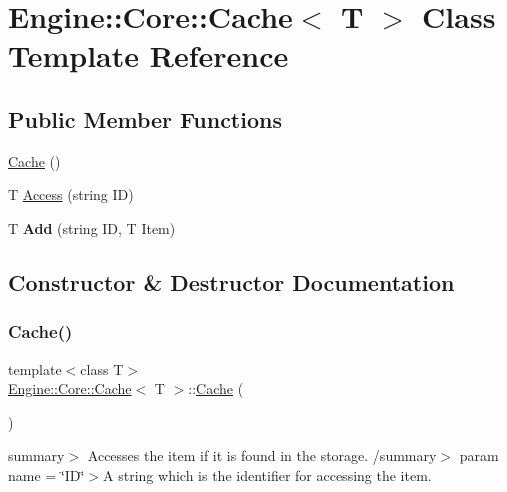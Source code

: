 \hypertarget{class_engine_1_1_core_1_1_cache}{}\section{Engine\+:\+:Core\+:\+:Cache$<$ T $>$ Class Template Reference}
\label{class_engine_1_1_core_1_1_cache}
\subsection*{Public Member Functions}
\begin{DoxyCompactItemize}
\item 
\hyperlink{class_engine_1_1_core_1_1_cache_a18673becad0012e4db441535744d8e0f}{Cache} ()
\item 
T \hyperlink{class_engine_1_1_core_1_1_cache_a1a4d83ac2cc8656acb5c99e4999e1551}{Access} (string ID)
\item 
\mbox{\label{class_engine_1_1_core_1_1_cache_aa9c31c77611ffd712133d233f374e3c5}} 
T {\bfseries Add} (string ID, T Item)
\end{DoxyCompactItemize}


\subsection{Constructor \& Destructor Documentation}
\mbox{\label{class_engine_1_1_core_1_1_cache_a18673becad0012e4db441535744d8e0f}} 
\subsubsection{\texorpdfstring{Cache()}{Cache()}}
{\footnotesize\ttfamily template$<$class T$>$ \\
\hyperlink{class_engine_1_1_core_1_1_cache}{Engine\+::\+Core\+::\+Cache}$<$ T $>$\+::\hyperlink{class_engine_1_1_core_1_1_cache}{Cache} (\begin{DoxyParamCaption}{ }\end{DoxyParamCaption})\hspace{0.3cm}{\ttfamily [inline]}}

summary$>$ Accesses the item if it is found in the storage. /summary$>$ param name = \char`\"{}\+I\+D\char`\"{}$>$A string which is the identifier for accessing the item.

